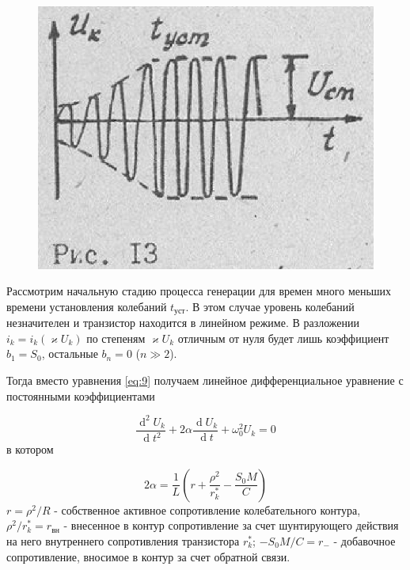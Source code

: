 \begin{figure}
\includegraphics[width=\linewidth]{circuit/13.jpg}
\caption{}
\label{fig:figure13}
\vspace{-20pt}
\end{figure}

Рассмотрим начальную стадию процесса генерации для времен много меньших времени установления колебаний $t_\text{уст}$. В этом случае уровень колебаний незначителен и транзистор находится в линейном режиме. В разложении $i_k=i_k(\varkappa U_k)$ по степеням $\varkappa U_k$ отличным от нуля будет лишь коэффициент $b_1=S_0$, остальные $b_n=0$ ($n\gg2$).

Тогда вместо уравнения \eqref{eq:9} получаем линейное дифференциальное уравнение с постоянными коэффициентами

\begin{equation}
\frac{\operatorname d^2U_k}{\operatorname dt^2}+2\alpha \frac{\operatorname d U_k}{\operatorname dt}+\omega_0^2U_k=0
\label{eq:10}
\end{equation}
в котором

\begin{equation}
2\alpha=\frac{1}{L}(r+\frac{\rho^2}{r_k^*}-\frac{S_0M}{C})
\label{eq:11}
\end{equation}
$\displaystyle r=\rho^2/R$ - собственное активное сопротивление колебательного контура, $\displaystyle \rho^2/r_k^*=r_\text{вн}$ - внесенное в контур сопротивление за счет шунтирующего действия на него внутреннего сопротивления транзистора $r_k^*$; $-S_0M/C=r_{-}$ - добавочное сопротивление, вносимое в контур за счет обратной связи. 


